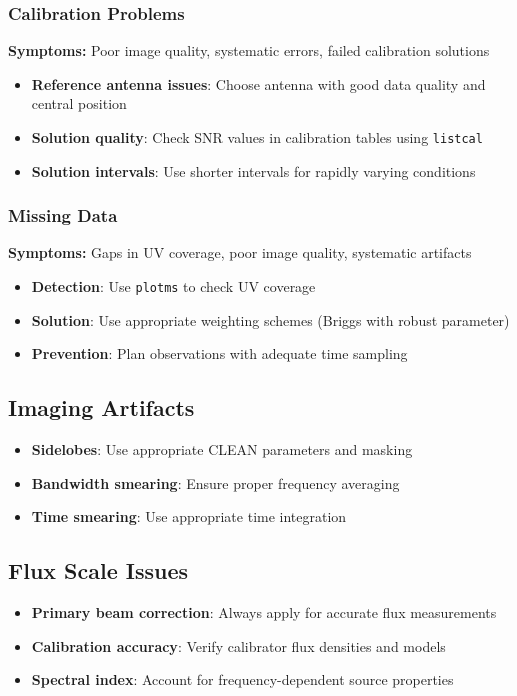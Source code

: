 \documentclass[11pt]{article}
\begin{document}
\subsubsection{Calibration Problems}
\textbf{Symptoms:} Poor image quality, systematic errors, failed calibration solutions
\begin{itemize}
    \item \textbf{Reference antenna issues}: Choose antenna with good data quality and central position
    \item \textbf{Solution quality}: Check SNR values in calibration tables using \texttt{listcal}
    \item \textbf{Solution intervals}: Use shorter intervals for rapidly varying conditions
\end{itemize}

\subsubsection{Missing Data}
\textbf{Symptoms:} Gaps in UV coverage, poor image quality, systematic artifacts
\begin{itemize}
    \item \textbf{Detection}: Use \texttt{plotms} to check UV coverage
    \item \textbf{Solution}: Use appropriate weighting schemes (Briggs with robust parameter)
    \item \textbf{Prevention}: Plan observations with adequate time sampling
\end{itemize}

\subsection{Imaging Artifacts}
\begin{itemize}
    \item \textbf{Sidelobes}: Use appropriate CLEAN parameters and masking
    \item \textbf{Bandwidth smearing}: Ensure proper frequency averaging
    \item \textbf{Time smearing}: Use appropriate time integration
\end{itemize}

\subsection{Flux Scale Issues}
\begin{itemize}
    \item \textbf{Primary beam correction}: Always apply for accurate flux measurements
    \item \textbf{Calibration accuracy}: Verify calibrator flux densities and models
    \item \textbf{Spectral index}: Account for frequency-dependent source properties
\end{itemize}
\end{document}
